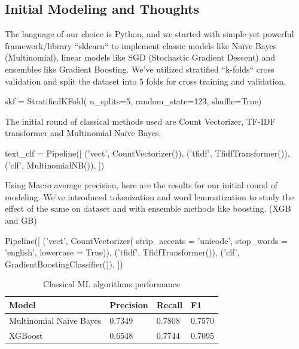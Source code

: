 \documentclass[conference]{IEEEtran}
\begin{document}
\subsection{Initial Modeling and Thoughts}
The language of our choice is Python, and we started with simple yet powerful framework/library ``sklearn`` to implement classic models like Naïve Bayes (Multinomial), linear models like SGD (Stochastic Gradient Descent) and ensembles like Gradient Boosting.
We’ve utilized stratified ``k-folds`` cross validation and split the dataset into 5 folds for cross training and validation. 
\begin{verbatimtab}[4]
skf = StratifiedKFold(
	n_splits=5,
	random_state=123,
	shuffle=True)
\end{verbatimtab}
The initial round of classical methods used are Count Vectorizer, TF-IDF transformer and Multinomial Naïve Bayes.
\begin{verbatimtab}[4]
text_clf = Pipeline([
    ('vect', CountVectorizer()),
    ('tfidf', TfidfTransformer()),
    ('clf', MultinomialNB()),
])
\end{verbatimtab}
Using Macro average precision, here are the results for our initial round of modeling.
We’ve introduced tokenization and word lemmatization to study the effect of the same on dataset and with ensemble methods like boosting. (XGB and GB)
\begin{verbatimtab}[4]
Pipeline([
    ('vect', CountVectorizer(
    	strip_accents = 'unicode',
         stop_words = 'english',
         lowercase = True)),
    ('tfidf', TfidfTransformer()),
    ('clf', GradientBoostingClassifier()),
])
\end{verbatimtab}
\begin{table}[htbp]
	\caption{Classical ML algorithms performance}
	\begin{center}
		\begin{tabular}{|l|l|l|l|}
			\hline
			\textbf{Model} & \textbf{Precision} & \textbf{Recall} & \textbf{F1}\\ \hline
			Multinomial Naïve Bayes & 0.7349 & 0.7808 & 0.7570 \\ \hline
			XGBoost & 0.6548 & 0.7744 & 0.7095 \\ \hline
		\end{tabular}
		\label{tab2}
	\end{center}
\end{table}
\end{document}
